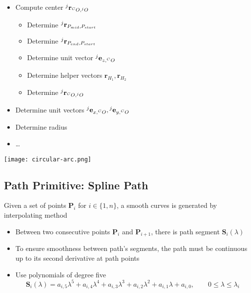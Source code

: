 \begin{minipage}{.5\textwidth}
	\begin{itemize}
		\item Compute center $\prescript{j}{}{\textbf{r}}_{\prescript{C}{}{O}, \prescript{j}{}{O}}$
		\begin{itemize}
			\item Determine $\prescript{j}{}{\textbf{r}}_{P_{mid}, P_{start}}$
			\item Determine $\prescript{j}{}{\textbf{r}}_{P_{end}, P_{start}}$
			\item Determine unit vector $\prescript{j}{}{\textbf{e}}_{z,\prescript{C}{}{O}}$
			\item Determine helper vectors $\textbf{r}_{H_1}, \textbf{r}_{H_2}$
			\item Determine $\prescript{j}{}{\textbf{r}}_{\prescript{C}{}{O}, \prescript{j}{}{O}}$
		\end{itemize}
		\item Determine unit vectors $\prescript{j}{}{\textbf{e}}_{x,\prescript{C}{}{O}}, \prescript{j}{}{\textbf{e}}_{y,\prescript{C}{}{O}}$
		\item Determine radius
		\item \dots
	\end{itemize}
\end{minipage}
\begin{minipage}{.45\textwidth}
	\centering
	\texttt{[image: circular-arc.png]}
\end{minipage}

\subsection{Path Primitive: Spline Path}
Given a set of points $\textbf{P}_i$ for $i\in\{1,n\}$, a smooth curves is generated by interpolating method
\begin{itemize}
	\item Between two consecutive points $\textbf{P}_i$ and $\textbf{P}_{i+1}$, there is path segment $\textbf{S}_i(\lambda)$
	\item To ensure smoothness between path's segments, the path must be continuous up to its second derivative at path points
	\item Use polynomials of degree five
	\[\textbf{S}_i(\lambda) = a_{i,5} \lambda^5 + a_{i,4} \lambda^4 + a_{i,3} \lambda^3 + a_{i,2} \lambda^2 + a_{i,1} \lambda + a_{i,0}, \qquad 0\leq \lambda \leq \lambda_i \]
\end{itemize}

